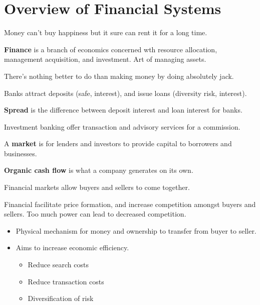 \documentclass[english, 12pt]{article}
\begin{document}
\notesheader
\section{Overview of Financial Systems}
Money can't buy happiness but it sure can rent it for a long time.
\begin{defn}
\textbf{Finance} is a branch of economics concerned wth resource allocation, management acquisition, and investment. Art of managing assets.
\end{defn}
\begin{qte}
There's nothing better to do than making money by doing absolutely jack.
\end{qte}
Banks attract deposits (safe, interest), and issue loans (diversity risk, interest).
\begin{defn}
\textbf{Spread} is the difference between deposit interest and loan interest for banks.
\end{defn}

\begin{note}
Investment banking offer transaction and advisory services for a commission.
\end{note}


\begin{defn}
A \textbf{market} is for lenders and investors to provide capital to borrowers and businesses.
\end{defn}
\begin{defn}
\textbf{Organic cash flow} is what a company generates on its own.
\end{defn}

\begin{qte}
Financial markets allow buyers and sellers to come together.
\end{qte}
\begin{note}
Financial facilitate price formation, and increase competition amongst buyers and sellers. Too much power can lead to decreased competition.

\begin{itemize}
\item Physical mechanism for money and ownership to transfer from buyer to seller.
\item Aims to increase economic efficiency.
\begin{itemize}
\item Reduce search costs
\item Reduce transaction costs
\item Diversification of risk
\end{itemize}
\end{itemize}
\end{note}
\end{document}
